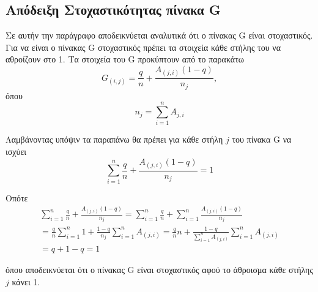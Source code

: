 \documentclass[First Project.tex]{subfiles}
\begin{document}
\subsection{ Απόδειξη Στοχαστικότητας πίνακα \textlatin{G}  }

Σε αυτήν την παράγραφο αποδεικνύεται αναλυτικά ότι ο πίνακας \textlatin{G} είναι στοχαστικός. 
Για να είναι ο πίνακας \textlatin{G} στοχαστικός πρέπει τα στοιχεία κάθε στήλης του να αθροίζουν στο 1. Τα στοιχεία του \textlatin{G} 
προκύπτουν από το παρακάτω 
\begin{equation*}
    G_{(i,j)} = \frac{q}{n} + \frac{A_{(j,i)}(1-q)}{n_{j}}, 
\end{equation*}
όπου
\begin{equation*}
    n_{j} = \sum_{i=1}^{n} A_{j,i}
\end{equation*}

Λαμβάνοντας υπόψιν τα παραπάνω θα πρέπει για κάθε στήλη $j$ του πίνακα \textlatin{G} να ισχύει 
\begin{equation*}
    \sum_{i=1}^{n} \frac{q}{n} + \frac{A_{(j,i)}(1-q)}{n_{j}} = 1
\end{equation*}

Οπότε
\begin{gather*}
    \sum_{i=1}^{n} \frac{q}{n} + \frac{A_{(j,i)}(1-q)}{n_{j}} = \sum_{i=1}^{n} \frac{q}{n} + \sum_{i=1}^{n} \frac{A_{(j,i)}(1-q)}{n_{j}} \\
    = \frac{q}{n} \sum_{i=1}^{n} 1 + \frac{1-q}{n_{j}} \sum_{i=1}^{n} A_{(j,i)} = \frac{q}{n} n +  \frac{1-q}{\sum_{i=1}^{n} A_{(j,i)}} \sum_{i=1}^{n} A_{(j,i)} \\
    = q + 1 - q = 1
\end{gather*}

όπου αποδεικνύεται ότι ο πίνακας \textlatin{G} είναι στοχαστικός αφού το άθροισμα κάθε στήλης $j$ κάνει 1.
\end{document}
